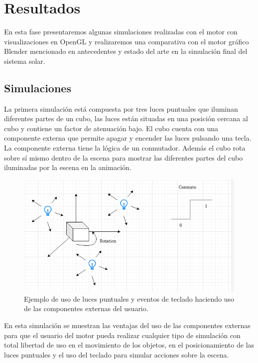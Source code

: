 \documentclass[a4paper, 17pt]{book}
\begin{document}
\cleardoublepage
\chapter{Resultados}

En esta fase presentaremos algunas simulaciones realizadas con el motor con visualizaciones en OpenGL y realizaremos una comparativa
con el motor gráfico Blender mencionado en antecedentes y estado del arte en la simulación final del sistema solar.

\section{Simulaciones}
\label{sec:Simulaciones}

La primera simulación está compuesta por tres luces puntuales que iluminan diferentes partes de un cubo, las luces están situadas
en una posición cercana al cubo y contiene un factor de atenuación bajo. El cubo cuenta con una componente externa que permite
apagar y encender las luces pulsando una tecla. La componente externa tiene la lógica de un conmutador. Además el cubo rota sobre
sí mismo dentro de la escena para mostrar las diferentes partes del cubo iluminadas por la escena en la animación.

\begin{figure}[hbt!]
    \centering
    \includegraphics[scale=0.50, keepaspectratio]{img/SimpleCube.png}
    \caption{Ejemplo de uso de luces puntuales y eventos de teclado haciendo uso de las componentes externas del usuario.}
    \label{figura:SimpleCube}
\end{figure}

En esta simulación se muestran las ventajas del uso de las componentes externas para que el usuario del motor pueda realizar
cualquier tipo de simulación con total libertad de uso en el movimiento de los objetos, en el posicionamiento de las luces
puntuales y el uso del teclado para simular acciones sobre la escena.
\end{document}
